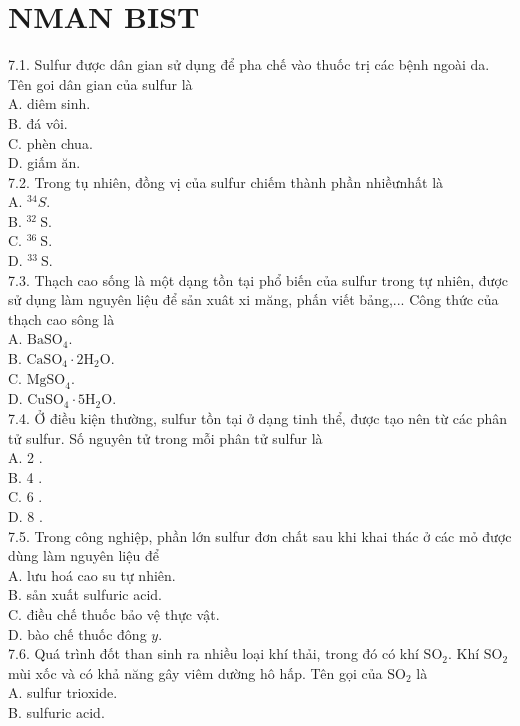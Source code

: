 \documentclass[10pt]{article}
\begin{document}
\section*{NMAN BIST}
7.1. Sulfur được dân gian sử dụng để pha chế vào thuốc trị các bệnh ngoài da. Tên goi dân gian của sulfur là\\
A. diêm sinh.\\
B. đá vôi.\\
C. phèn chua.\\
D. giấm ăn.\\
7.2. Trong tụ nhiên, đồng vị của sulfur chiếm thành phần nhiềưnhất là\\
A. ${ }^{34} S$.\\
B. ${ }^{32} \mathrm{~S}$.\\
C. ${ }^{36} \mathrm{~S}$.\\
D. ${ }^{33} \mathrm{~S}$.\\
7.3. Thạch cao sống là một dạng tồn tại phổ biến của sulfur trong tự nhiên, được sử dụng làm nguyên liệu để sản xuât xi măng, phấn viết bảng,... Công thức của thạch cao sông là\\
A. $\mathrm{BaSO}_{4}$.\\
B. $\mathrm{CaSO}_{4} \cdot 2 \mathrm{H}_{2} \mathrm{O}$.\\
C. $\mathrm{MgSO}_{4}$.\\
D. $\mathrm{CuSO}_{4} \cdot 5 \mathrm{H}_{2} \mathrm{O}$.\\
7.4. Ở điều kiện thường, sulfur tồn tại ở dạng tinh thể, được tạo nên từ các phân tử sulfur. Số nguyên tử trong mỗi phân tử sulfur là\\
A. 2 .\\
B. 4 .\\
C. 6 .\\
D. 8 .\\
7.5. Trong công nghiệp, phần lớn sulfur đơn chất sau khi khai thác ở các mỏ được dùng làm nguyên liệu để\\
A. lưu hoá cao su tự nhiên.\\
B. sån xuất sulfuric acid.\\
C. điều chế thuốc bảo vệ thực vật.\\
D. bào chế thuốc đông $y$.\\
7.6. Quá trình đốt than sinh ra nhiều loại khí thải, trong đó có khí $\mathrm{SO}_{2}$. Khí $\mathrm{SO}_{2}$ mùi xốc và có khả năng gây viêm dường hô hấp. Tên gọi của $\mathrm{SO}_{2}$ là\\
A. sulfur trioxide.\\
B. sulfuric acid.\\
\end{document}
